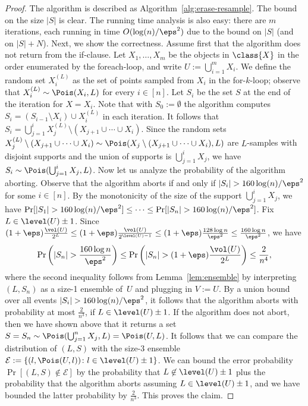 \begin{proof}
    The algorithm is described as Algorithm~\ref{alg:erase-resample}.
    The bound on the size $|S|$ is clear. The running time analysis is also easy: there are $m$ iterations, each running in time $O(\log(n)/\eps^2)$ due to the bound on $|S|$ (and on $|S|+N$).
%
    Next, we show the correctness. 
    Assume first that the algorithm does not return from the if-clause.
    Let $X_1, \dots, X_m$ be the objects in $\class{X}$ in the order enumerated by the foreach-loop, and write $U := \bigcup_{i=1}^m X_i$.
    We define the random set $X_i^{(L)}$ as the set of points sampled from $X_i$ in the for-$k$-loop; observe that $X_i^{(L)} \sim \Pois(X_i, L)$ for every $i \in [n]$.
    Let $S_i$ be the set $S$ at the end of the iteration for $X = X_i$. Note that with $S_0 := \emptyset$ the algorithm computes $S_i = (S_{i-1} \setminus X_i) \cup X_i^{(L)}$ in each iteration.
    It follows that $S_i = \bigcup_{j=1}^i X_j^{(L)} \setminus (X_{j+1} \cup \cdots \cup X_i)$. Since the random sets $X_j^{(L)} \setminus (X_{j+1} \cup \cdots \cup X_i) \sim \Pois(X_j \setminus (X_{j+1} \cup \cdots \cup X_i), L)$ are $L$-samples with disjoint supports and the union of supports is $\bigcup_{j=1}^i X_j$, we have $S_i \sim \Pois(\bigcup_{j=1}^i X_j, L)$.
%
    Now let us analyze the probability of the algorithm aborting. Observe that the algorithm aborts if and only if $|S_i| > 160 \log(n)/\eps^2$ for some $i \in [n]$. By the monotonicity of the size of the support $\bigcup_{j=1}^i X_j$, we have $\Pr[|S_1| > 160 \log(n)/\eps^2] \le \cdots \le \Pr[|S_n| > 160 \log(n)/\eps^2]$.
    Fix $L \in \level(U) \pm 1$. Since $(1 + \eps) \frac{\vol(U)}{2^L} \leq (1 + \eps) \frac{\vol(U)}{2^{\level(U)-1}} \leq (1+\eps) \frac{128 \log n}{\eps^2} \leq \frac{160 \log n}{\eps^2}$, we have
    \[
        \Pr\left( |S_n| > \frac{160 \log n}{\eps^2} \right)
        \leq \Pr\left( |S_n| > (1 + \eps) \frac{\vol(U)}{2^L} \right)
        \leq \frac{2}{n^4},
    \]
    where the second inequality follows from Lemma~\ref{lem:ensemble} by interpreting $(L,S_n)$ as a size-1 ensemble of~$U$ and plugging in $V := U$.
    By a union bound over all events $|S_i| > 160 \log(n)/\eps^2$, it follows that the algorithm aborts with probability at most $\tfrac 2{n^3}$, if $L \in \level(U) \pm 1$.
%
    If the algorithm does not abort, then we have shown above that it returns a set $S = S_n \sim \Pois(\bigcup_{j=1}^n X_j, L) = \Pois(U, L)$. 
    It follows that we can compare the distribution of $(L,S)$ with the size-3 ensemble $\mathcal{E} := \{(l, \Pois(U,l)) \colon l \in \level(U) \pm 1\}$. We can bound the error probability $\Pr[(L,S) \not\in \mathcal{E}]$ by the probability that $L \not\in \level(U) \pm 1$ plus the probability that the algorithm aborts assuming $L \in \level(U) \pm 1$, and we have bounded the latter probability by $\tfrac 2{n^3}$. This proves the claim.
\end{proof}
%
